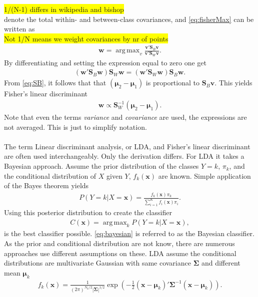 \documentclass[10pt,a4paper]{article}
\DeclareMathOperator*{\argmax}{arg\,max}
\begin{document}
\colorbox{yellow}{1/(N-1) differs in wikipedia and bishop}\\
denote the total within- and between-class covariances, and \eqref{eq:fisherMax} can be written as
\\ \colorbox{yellow}{Not 1/N means we weight covariances by nr of points}\\
\begin{align}
  \mathbf{w} = \argmax_v  \frac{\mathbf{v}'\mathbf{S}_B \mathbf{v}}{\mathbf{v}' \mathbf{S}_W \mathbf{v}}.
\end{align}
By differentiating and setting the expression equal to zero one get
\begin{align}
  (\mathbf{w}' \mathbf{S}_B \mathbf{w})\mathbf{S}_W \mathbf{w} = (\mathbf{w}' \mathbf{S}_W \mathbf{w})\mathbf{S}_B \mathbf{w}.
\end{align}
From \eqref{eq:SB}, it follows that that $(\bm{\mu}_2 - \bm{\mu}_1)$ is proportional to $\mathbf{S}_B \mathbf{v}$. This yields Fisher's linear discriminant
\begin{align}
  \mathbf{w} \propto \mathbf{S}_W^{-1} (\bm \mu_2 - \bm \mu_1).
\end{align}
Note that even the terms \textit{variance} and \textit{covariance} are used, the expressions are not averaged. This is just to simplify notation. \\
\\
The term Linear discriminant analysis, or LDA, and Fisher's linear discriminant are often used interchangeably. Only the derivation differs. For LDA it takes a Bayesian approach. Assume the prior distribution of the classes $Y=k$, $\pi_k$, and the conditional distribution of $X$ given $Y$, $f_k(\mathbf{x})$ are known. Simple application of the Bayes theorem yields 
\begin{align}
  P(Y=k|X=\mathbf{x}) = \frac{f_k(\mathbf{x}) \pi_k}{\sum^{K}_{i=1} f_i(\mathbf{x})\pi_i} .
\end{align}
Using this posterior distribution to create the classifier
\begin{align}
  \label{eq:bayesian} 
  C(\mathbf{x}) = \argmax_k P(Y=k|X=\mathbf{x}),
\end{align}
is the best classifier possible. \eqref{eq:bayesian} is referred to as the Bayesian classifier. As the prior and conditional distribution are not know, there are numerous approaches use different assumptions on these. LDA assume the conditional distributions are multivariate Gaussian with same covariance $\bm{\Sigma}$ and different mean $\bm\mu_k$
\begin{align}
  f_k(\mathbf{x}) =  \frac{1}{(2\pi)^{N_k/2}|\bm{\Sigma}|^{1/2}} \exp\left( -\frac{1}{2} (\mathbf{x}-\bm \mu_k)' \bm{\Sigma}^{-1} (\mathbf{x}-\bm \mu_k)\right).
\end{align}
\end{document}
